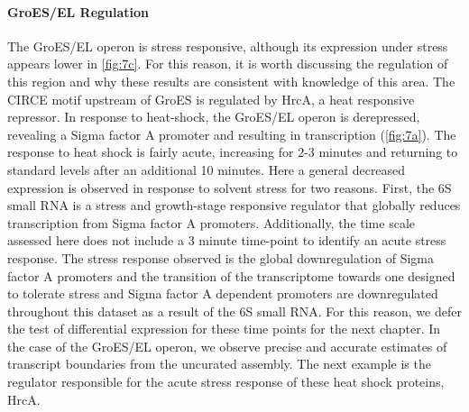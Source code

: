 \paragraph{GroES/EL Regulation}
The GroES/EL operon is stress responsive, although its expression under stress appears lower in \ref{fig:7c}. For this reason, it is worth discussing the regulation of this region and why these results are consistent with knowledge of this area. The CIRCE motif upstream of GroES is regulated by HrcA, a heat responsive repressor\cite{42,77,78}. In response to heat-shock, the GroES/EL operon is derepressed, revealing a Sigma factor A promoter and resulting in transcription (\ref{fig:7a}). The response to heat shock is fairly acute, increasing for 2-3 minutes and returning to standard levels after an additional 10 minutes\cite{77}. Here a general decreased expression is observed in response to solvent stress for two reasons. First, the 6S small RNA is a stress and growth-stage responsive regulator that globally reduces transcription from Sigma factor A promoters\cite{39,79}. Additionally, the time scale assessed here does not include a 3 minute time-point to identify an acute stress response. The stress response observed is the global downregulation of Sigma factor A promoters and the transition of the transcriptome towards one designed to tolerate stress and Sigma factor A dependent promoters are downregulated throughout this dataset as a result of the 6S small RNA. For this reason, we defer the test of differential expression for these time points for the next chapter. In the case of the GroES/EL operon, we observe precise and accurate estimates of transcript boundaries from the uncurated assembly. The next example is the regulator responsible for the acute stress response of these heat shock proteins, HrcA.


